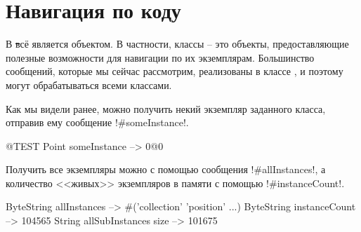 \documentclass[a4paper,10pt,twoside]{book}
\begin{document}
\section{Навигация по коду}

В \st всё является объектом. В частности, классы -- это объекты, предоставляющие полезные возможности для навигации по их экземплярам.
Большинство сообщений, которые мы сейчас рассмотрим, реализованы в классе , и поэтому могут обрабатываться всеми классами.

Как мы видели ранее, можно получить некий экземпляр заданного класса, отправив ему сообщение \ct!#someInstance!.
\begin{code}{@TEST} %
Point someInstance --> 0@0
\end{code}

Получить все экземпляры можно с помощью сообщения \ct!#allInstances!, а количество <<живых>> экземпляров в памяти с помощью \ct!#instanceCount!.
\begin{code}{} %
ByteString allInstances        --> #('collection' 'position'  ...)
ByteString instanceCount    --> 104565
String allSubInstances size -->  101675
\end{code}
\end{document}
